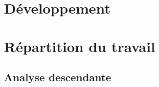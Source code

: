 \documentclass[11pt]{report}
\begin{document}
\part{Développement}


\setcounter{chapter}{0}
\part{Répartition du travail}

\chapter{Analyse descendante}
\begin{table}[h]
\begin{center}
\begin{tabular}{|l|c|c|c|c|c|}
	

\end{tabular}
\end{center}
\end{table}
\end{document}
